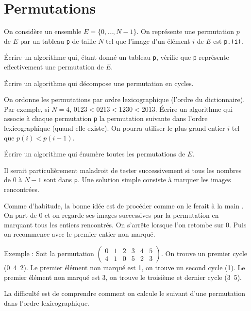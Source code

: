 \renewcommand{\SourceFile}{1-parcours-de-tableaux/src/1-7.ml}

\section{Permutations}

On considère un ensemble $E=\{0,...,N-1\}$. On représente une permutation $p$ de $E$ par un tableau \texttt{p} de taille $N$ tel que l'image d'un élément $i$ de $E$ est \texttt{p.(i)}.

\Q
Écrire un algorithme qui, étant donné un tableau \texttt{p}, vérifie que \texttt{p} représente effectivement une permutation de $E$.

\Q
Écrire un algorithme qui décompose une permutation en cycles.

\Q
On ordonne les permutations par ordre lexicographique (l'ordre du dictionnaire). Par exemple, si $N=4$, $0123<0213<1230<2013$. Écrire un algorithme qui associe à chaque permutation \texttt{p} la permutation suivante dans l'ordre lexicographique (quand elle existe). On pourra utiliser le plus grand entier $i$ tel que $p(i)<p(i+1)$.

\Q
Écrire un algorithme qui énumère toutes les permutations de $E$.

\Corrige

\Q
Il serait particulièrement maladroit de tester successivement si tous les nombres de 0 à $N-1$ sont dans \texttt{p}. Une solution simple consiste à marquer les images rencontrées.



\Q
Comme d'habitude, la bonne idée est de procéder comme on le ferait \og à la main \fg{}. On part de 0 et on regarde ses images successives par la permutation en marquant tous les entiers rencontrés. On s'arrête lorsque l'on retombe sur 0. Puis on recommence avec le premier entier non marqué.
\medskip

Exemple : Soit la permutation $\begin{pmatrix}
    0 & 1 & 2 & 3 & 4 & 5 \\
    4 & 1 & 0 & 5 & 2 & 3
\end{pmatrix}$.
On trouve un premier cycle (0~4~2). Le premier élément non marqué est 1, on trouve un second cycle (1). Le premier élément non marqué est 3, on trouve le troisième et dernier cycle (3~5).



\Q
La difficulté est de comprendre comment on calcule le suivant d'une permutation dans l'ordre lexicographique.
\medskip

